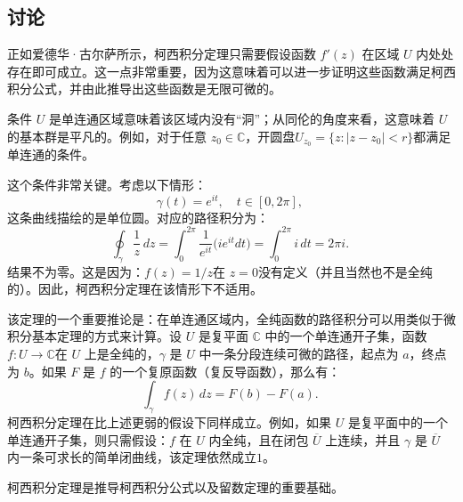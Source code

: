 \subsection{讨论}
正如爱德华·古尔萨所示，柯西积分定理只需要假设函数 $f'(z)$ 在区域 $U$ 内处处存在即可成立。这一点非常重要，因为这意味着可以进一步证明这些函数满足柯西积分公式，并由此推导出这些函数是无限可微的。

条件 $U$ 是单连通区域意味着该区域内没有“洞”；从同伦的角度来看，这意味着 $U$ 的基本群是平凡的。例如，对于任意 $z_0 \in \mathbb{C}$，开圆盘$U_{z_0} = \{z : |z - z_0| < r \}$都满足单连通的条件。

这个条件非常关键。考虑以下情形：
$$
\gamma(t) = e^{it}, \quad t \in [0, 2\pi],~
$$
这条曲线描绘的是单位圆。对应的路径积分为：
$$
\oint_{\gamma} \frac{1}{z}\,dz
= \int_0^{2\pi} \frac{1}{e^{it}} \big(i e^{it} dt\big)
= \int_0^{2\pi} i\, dt
= 2\pi i.~
$$
结果不为零。这是因为：$f(z) = 1/z$在 $z = 0$没有定义（并且当然也不是全纯的）。因此，柯西积分定理在该情形下不适用。

该定理的一个重要推论是：在单连通区域内，全纯函数的路径积分可以用类似于微积分基本定理的方式来计算。设 $U$ 是复平面 $\mathbb{C}$ 中的一个单连通开子集，函数$f: U \to \mathbb{C}$在 $U$ 上是全纯的，$\gamma$ 是 $U$ 中一条分段连续可微的路径，起点为 $a$，终点为 $b$。如果 $F$ 是 $f$ 的一个复原函数（复反导函数），那么有：
$$
\int_{\gamma} f(z)\,dz = F(b) - F(a).~
$$
柯西积分定理在比上述更弱的假设下同样成立。例如，如果 $U$ 是复平面中的一个单连通开子集，则只需假设：$f$ 在 $U$ 内全纯，且在闭包 $\overline{U}$ 上连续，并且 $\gamma$ 是 $\overline{U}$ 内一条可求长的简单闭曲线，该定理依然成立$1$。

柯西积分定理是推导柯西积分公式以及留数定理的重要基础。
